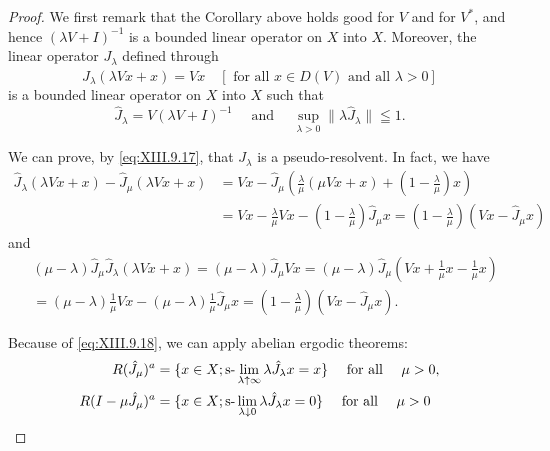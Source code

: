 \begin{proof}
 We first remark that the Corollary above holds good for $V$ and for $V^{*}$, and hence $(\lambda V + I)^{-1}$ is a bounded linear operator on $X$ into $X$. Moreover, the linear operator $J_{\lambda}$ defined through 
\begin{equation}\label{eq:XIII.9.17}
\hat {J} _{\lambda} (\lambda V x + x) = V x \quad [ \text{ for all } x \in D (V) \text{ and all } \lambda > 0 ]
\end{equation}
is a bounded linear operator on $X$ into $X$ such that 
\begin{equation}\label{eq:XIII.9.18}
\hat {J} _{\lambda} = V (\lambda V + I) ^{-1} \quad \text{ and } \quad \sup\limits _{\lambda > 0} \| \lambda \hat {J} _{\lambda} \| \leqq 1. \end{equation}

We can prove, by \eqref{eq:XIII.9.17}, that $J_{\lambda}$ is a pseudo-resolvent. In fact, we have 
\[
\begin{aligned} \hat {J} _{\lambda} (\lambda V x + x) - \hat {J} _{\mu} (\lambda V x + x) & = V x - \hat {J} _{\mu} \left(\frac {\lambda}{\mu} (\mu V x + x) + \left(1 - \frac {\lambda}{\mu}\right) x\right) \\ & = V x - \frac {\lambda}{\mu} V x - \left(1 - \frac {\lambda}{\mu}\right) \hat {J} _{\mu} x = \left(1 - \frac {\lambda}{\mu}\right) (V x - \hat {J} _{\mu} x) \end{aligned}
\]
and 
\[
\begin{aligned}
&(\mu - \lambda) \hat {J} _{\mu} \hat {J} _{\lambda} (\lambda V x + x) = (\mu - \lambda) \hat {J} _{\mu} V x = (\mu - \lambda) \hat {J} _{\mu} \left(V x + \frac {1}{\mu} x - \frac {1}{\mu} x\right)
\\
&= (\mu - \lambda) \frac {1}{\mu} V x - (\mu - \lambda) \frac {1}{\mu} \hat {J} _{\mu} x = \left(1 - \frac {\lambda}{\mu}\right) (V x - \hat {J} _{\mu} x).
\end{aligned}
\]

Because of \eqref{eq:XIII.9.18}, we can apply abelian ergodic theorems: 
\begin{align}
R (\hat {J} _{\mu}) ^{a}& = \{x \in X; \text{s-}\lim _{\lambda \uparrow \infty} \lambda \hat {J} _{\lambda} x = x \} \quad \text{ for all } \quad \mu > 0, \label{eq:XIII.9.19} \\
R (I - \mu \hat {J} _{\mu}) ^{a}& = \{x \in X; \text{s-}\lim _{\lambda \downarrow 0} \lambda \hat {J} _{\lambda} x = 0 \} \quad \text{ for all } \quad \mu > 0 \label{eq:XIII.9.20}
\end{align}


\end{proof}
